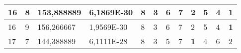 \documentclass[conference]{IEEEtran}
\begin{document}
\begin{table*}[]
\begin{tabular}{|llll|llllllll|}
\multicolumn{1}{|l|}{16}                                                    & \multicolumn{1}{l|}{8}                                                        & \multicolumn{1}{l|}{153,888889}                                                   & 6,1869E-30                     & \multicolumn{1}{l|}{8}                                                  & \multicolumn{1}{l|}{3}                                                  & \multicolumn{1}{l|}{6}                                                  & \multicolumn{1}{l|}{7}                                                  & \multicolumn{1}{l|}{2}                                                  & \multicolumn{1}{l|}{5}                                                  & \multicolumn{1}{l|}{4}                                                  & \textbf{1}                 \\ \hline
\multicolumn{1}{|l|}{16}                                                    & \multicolumn{1}{l|}{9}                                                        & \multicolumn{1}{l|}{156,266667}                                                   & 1,9569E-30                     & \multicolumn{1}{l|}{8}                                                  & \multicolumn{1}{l|}{3}                                                  & \multicolumn{1}{l|}{6}                                                  & \multicolumn{1}{l|}{7}                                                  & \multicolumn{1}{l|}{2}                                                  & \multicolumn{1}{l|}{5}                                                  & \multicolumn{1}{l|}{4}                                                  & \textbf{1}                 \\ \hline
\multicolumn{1}{|l|}{17}                                                    & \multicolumn{1}{l|}{7}                                                        & \multicolumn{1}{l|}{144,388889}                                                   & 6,1111E-28                     & \multicolumn{1}{l|}{8}                                                  & \multicolumn{1}{l|}{3}                                                  & \multicolumn{1}{l|}{5}                                                  & \multicolumn{1}{l|}{7}                                                  & \multicolumn{1}{l|}{\textbf{1}}                                         & \multicolumn{1}{l|}{4}                                                  & \multicolumn{1}{l|}{6}                                                  & 2                          \\ \hline

\end{tabular}
\end{table*}
\end{document}
